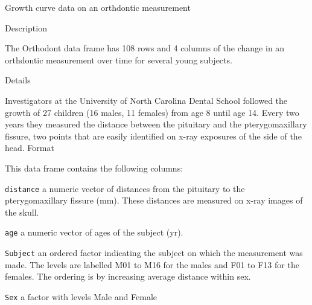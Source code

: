 Growth curve data on an orthdontic measurement


Description

The Orthodont data frame has 108 rows and 4 columns of the change in an orthdontic measurement 
over time for several young subjects.


Details

Investigators at the University of North Carolina Dental School followed the growth of 27 children (16 males, 11 females) from age 8 until age 14. Every two years they measured the distance between the pituitary and the pterygomaxillary fissure, two points that are easily identified on x-ray exposures of the side of the head.
Format

This data frame contains the following columns:

\texttt{distance}
a numeric vector of distances from the pituitary to the pterygomaxillary fissure (mm). These distances are measured on x-ray images of the skull.

\texttt{age}
a numeric vector of ages of the subject (yr).

\texttt{Subject}
an ordered factor indicating the subject on which the measurement was made. The levels are labelled M01 to M16 for the males and F01 to F13 for the females. The ordering is by increasing average distance within sex.

\texttt{Sex}
a factor with levels Male and Female


